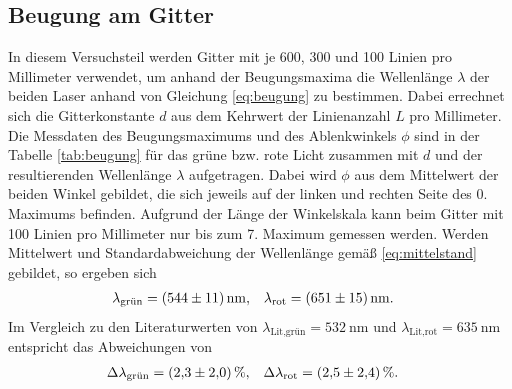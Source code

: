 \subsection{Beugung am Gitter}

In diesem Versuchsteil werden Gitter mit je 600, 300 und 100 Linien pro Millimeter verwendet, um anhand der Beugungsmaxima die Wellenlänge 
$\lambda$ der beiden Laser anhand von Gleichung \eqref{eq:beugung} zu bestimmen.
Dabei errechnet sich die Gitterkonstante $d$ aus dem Kehrwert der Linienanzahl $L$ pro Millimeter.
Die Messdaten des Beugungsmaximums und des Ablenkwinkels $\phi$ sind in der Tabelle \ref{tab:beugung} für das grüne bzw. rote Licht
zusammen mit $d$ und der resultierenden Wellenlänge $\lambda$ aufgetragen.
Dabei wird $\phi$ aus dem Mittelwert der beiden Winkel gebildet, die sich jeweils auf der linken und rechten Seite des 0. Maximums befinden.
Aufgrund der Länge der Winkelskala kann beim Gitter mit 100 Linien pro Millimeter nur bis zum 7. Maximum gemessen werden.
Werden Mittelwert und Standardabweichung der Wellenlänge gemäß \eqref{eq:mittelstand} gebildet, so ergeben sich
\begin{align}
    \lambda_\text{grün} & = (\num[]{544 +- 11}) \, \unit[]{\nano\meter}, & \lambda_\text{rot} & = (\num[]{651 +- 15}) \, \unit[]{\nano\meter}.
\end{align}
Im Vergleich zu den Literaturwerten \cite[]{man:v400} von $\lambda_\text{Lit,grün} = \qty[]{532}{\nano\meter}$ und 
$\lambda_\text{Lit,rot} = \qty[]{635}{\nano\meter}$ entspricht das Abweichungen von 
\begin{align}
    \Delta \lambda_\text{grün} &= (\num[]{2.3 +- 2.0}) \, \%, & \Delta \lambda_\text{rot} &= (\num[]{2.5 +- 2.4}) \, \%.
\end{align}



